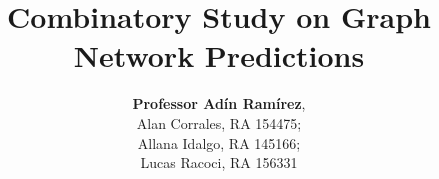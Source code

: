 \documentclass[11pt,a4paper]{article}
\begin{document}
\sloppy





\title{Combinatory Study on Graph Network Predictions}

\author{
    \normalsize
    \textbf{Professor Adín Ramírez},
    \normalsize
    \\
    \normalsize
    Alan Corrales, RA 154475; \\
    Allana Idalgo, RA 145166; \\
    Lucas  Racoci, RA 156331
}
\date{\vspace{-5ex}}
\maketitle


\vspace*{0.5cm}

\begin{spacing}{1.15}

\setcounter{page}{1}


\setcounter{page}{1}







\end{spacing}

{\small
\begin{singlespace}


\end{singlespace}
}


\end{document}
